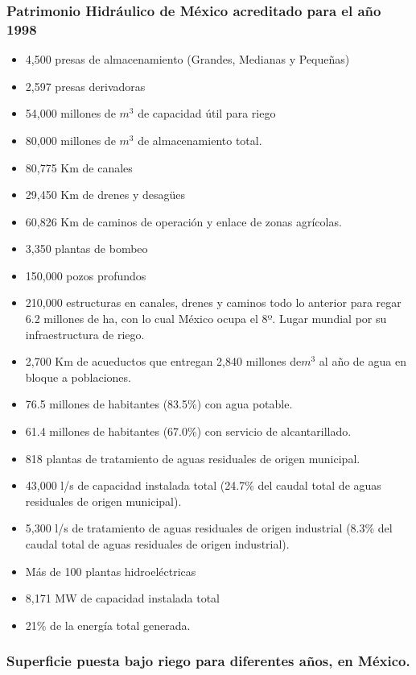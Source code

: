 \subsubsection{Patrimonio Hidráulico de México acreditado para el año 1998}
\begin{itemize}
	\item 4,500 presas de almacenamiento (Grandes, Medianas y Pequeñas)
	\item 2,597 presas derivadoras
	\item 54,000 millones de $m^3$ de capacidad útil para riego
	\item 80,000 millones de $m^3$ de almacenamiento total.
	\item 80,775 Km de canales
	\item 29,450 Km de drenes y desagües
	\item 60,826 Km de caminos de operación y enlace de zonas agrícolas.
	\item 3,350 plantas de bombeo
	\item 150,000 pozos profundos
	\item 210,000 estructuras en canales, drenes y caminos todo lo anterior para regar 6.2 millones de ha, con lo cual México ocupa el 8º. Lugar mundial por su infraestructura de riego.
	\item 2,700 Km de acueductos que entregan 2,840 millones de$ m^3$ al año de agua en bloque a poblaciones.
	\item 76.5 millones de habitantes (83.5\%) con agua potable.
	\item 61.4 millones de habitantes (67.0\%) con servicio de alcantarillado.
	\item 818 plantas de tratamiento de aguas residuales de origen municipal.
	\item 43,000 l/s de capacidad instalada total (24.7\% del caudal total de aguas residuales de origen municipal).
	\item 5,300 l/s de tratamiento de aguas residuales de origen industrial (8.3\% del caudal total de aguas residuales de origen industrial).
	\item Más de 100 plantas hidroeléctricas
	\item 8,171 MW de capacidad instalada total
	\item 21\% de la energía total generada.
\end{itemize}
\subsubsection{Superficie puesta bajo riego para diferentes años, en México.}

